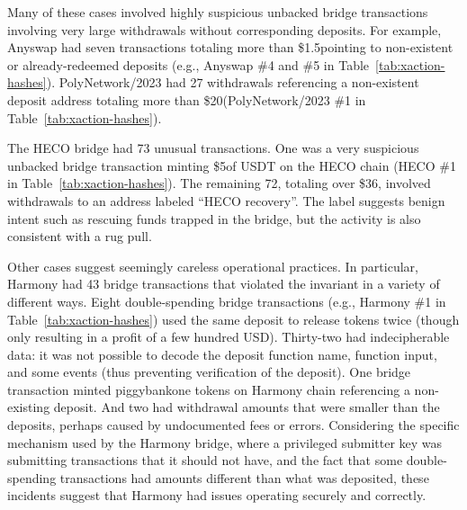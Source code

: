 
Many of these cases involved highly suspicious unbacked bridge
transactions involving very large withdrawals without corresponding
deposits.  For example, Anyswap had seven transactions totaling more than
\$1.5\mil pointing to non-existent or already-redeemed deposits (e.g., Anyswap \#4 and \#5 in
Table~\ref{tab:xaction-hashes}).
%
PolyNetwork/2023 had 27 withdrawals referencing a non-existent
deposit address totaling more than \$20\mil (PolyNetwork/2023 \#1 in Table~\ref{tab:xaction-hashes}).

The HECO bridge had 73 unusual transactions.  One was a very
suspicious unbacked bridge transaction minting \$5\mil of USDT on the
HECO chain (HECO \#1 in Table~\ref{tab:xaction-hashes}).  The
remaining 72, totaling over \$36\mil, involved withdrawals to an
address labeled ``HECO recovery''.  The label suggests benign intent
such as rescuing funds trapped in the bridge, but the activity is also
consistent with a rug pull.


Other cases suggest seemingly careless operational practices.  In particular,
%
Harmony had 43 bridge transactions that violated the invariant in a
variety of different ways.
Eight double-spending bridge transactions (e.g., Harmony \#1 in Table~\ref{tab:xaction-hashes}) used the same deposit to
release tokens twice (though only resulting in a profit of a few
hundred USD).  
Thirty-two
had indecipherable data:
it was not possible to decode the deposit function name, function
input, and some events (thus preventing verification of the deposit).
One bridge transaction minted piggybankone tokens on Harmony
chain referencing a non-existing deposit.  And two
had withdrawal amounts that were smaller than the deposits, perhaps
caused by undocumented fees or errors.
%
Considering the specific mechanism used by the Harmony bridge, where a privileged submitter key
was submitting transactions that it should not have, 
and the fact that some double-spending transactions had amounts 
different than what was deposited,
these
incidents suggest that Harmony had issues operating securely and
correctly.




